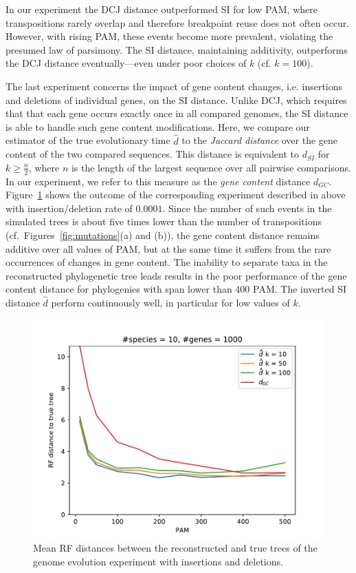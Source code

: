 \documentclass[9pt,english,utf8]{article}
\begin{document}
In our experiment the DCJ distance outperformed SI for low PAM, where
transpositions rarely overlap and therefore breakpoint reuse does not often
occur. However, with rising PAM, these events become more prevalent, violating
the presumed law of parsimony.  The SI distance, maintaining additivity,
outperforms the DCJ distance eventually---even under poor choices of $k$ (cf.
$k=100$).

\medskip
The last experiment concerns the impact of gene content changes, i.e.
insertions and deletions of individual genes, on the SI distance. Unlike DCJ,
which requires that that each gene occurs exactly once in all compared genomes,
the SI distance is able to handle such gene content modifications.  Here, we
compare our estimator of the true evolutionary time $\hat d$ to the
\emph{Jaccard distance} over the gene content of the two compared sequences.
This distance is equivalent to $d_{SI}$ for $k \geq \frac{n}{2}$, where $n$ is
the length of the largest sequence over all pairwise comparisons. In our
experiment, we refer to this measure as the \emph{gene content} distance
$d_{GC}$. Figure~\ref{fig:results_indel} shows the outcome of the corresponding
experiment described in above with insertion/deletion rate of $0.0001$. Since
the number of such events in the simulated trees is about five times lower than
the number of transpositions (cf.~Figures~\ref{fig:mutations}(a) and (b)), the
gene content distance remains additive over all values of PAM, but at the same
time it suffers from the rare occurrences of changes in gene content. The
inability to separate taxa in the reconstructed phylogenetic tree leads results
in the poor performance of the gene content distance for phylogenies with span
lower than 400 PAM. The inverted SI distance $\hat d$ perform continuously
well, in particular for low values of $k$. 


\begin{figure}[tb]
    
    \centering \includegraphics[width=0.8\columnwidth]{boxplot_s10_n1000_indel}

    \caption{Mean RF distances between the reconstructed and true trees of the
    genome evolution experiment with insertions and deletions.}
\label{fig:results_indel}
\end{figure}


 
 
\end{document}
